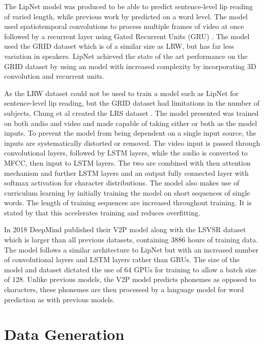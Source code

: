 \documentclass[12pt]{report}
\begin{document}
The LipNet model \cite{Assael2016} was produced to be able to predict sentence-level lip reading of varied length, while previous work by \cite{Chung2016} predicted on a word level.
The model used spatiotemporal convolutions to process multiple frames of video at once followed by a recurrent layer using Gated Recurrent Units (GRU) \cite{Cho2014}.
The model used the GRID dataset which is of a similar size as LRW, but has far less variation in speakers.
LipNet achieved the state of the art performance on the GRID dataset by using an model with increased complexity by incorporating 3D convolution and recurrent units.

As the LRW dataset could not be used to train a model such as LipNet for sentence-level lip reading, but the GRID dataset had limitations in the number of subjects, Chung et al created the LRS dataset \cite{Chung2017}.
The model presented was trained on both audio and video and made capable of taking either or both as the model inputs.
To prevent the model from being dependent on a single input source, the inputs are systematically distorted or removed.
The video input is passed through convolutional layers, followed by LSTM layers, while the audio is converted to MFCC, then input to LSTM layers.
The two are combined with then attention mechanism and further LSTM layers and an output fully connected layer with softmax activation for character distributions.
The model also makes use of curriculum learning by initially training the model on short sequences of single words.
The length of training sequences are increased throughout training.
It is stated by \cite{Chung2017} that this accelerates training and reduces overfitting.

In 2018 DeepMind published their V2P model \cite{Shillingford2018} along with the LSVSR dataset which is larger than all previous datasets, containing 3886 hours of training data.
The model follows a similar architecture to LipNet \cite{Assael2016} but with an increased number of convolutional layers and LSTM layers rather than GRUs.
The size of the model and dataset dictated the use of 64 GPUs for training to allow a batch size of 128.
Unlike previous models, the V2P model predicts phonemes as opposed to characters, these phonemes are then processed by a language model for word prediction as with previous models.


\chapter{Data Generation}
\end{document}
